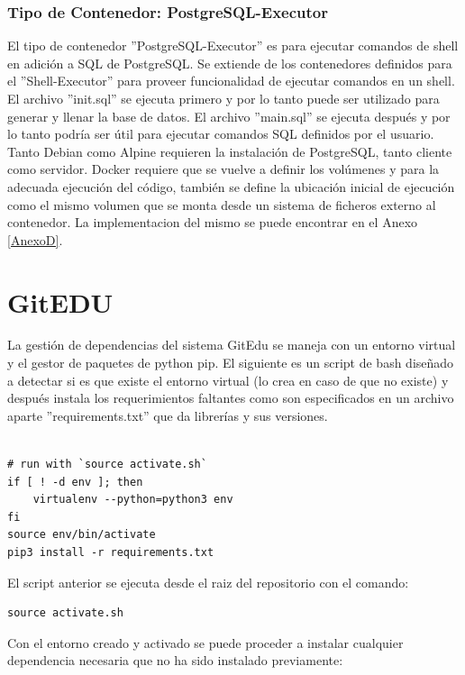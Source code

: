 \subsubsection{Tipo de Contenedor: PostgreSQL-Executor}
El tipo de contenedor ''PostgreSQL-Executor'' es para ejecutar comandos de shell en adición a SQL de PostgreSQL. Se extiende de los contenedores definidos para el ''Shell-Executor'' para proveer funcionalidad de ejecutar comandos en un shell. El archivo ''init.sql'' se ejecuta primero y por lo tanto puede ser utilizado para generar y llenar la base de datos. El archivo ''main.sql'' se ejecuta después y por lo tanto podría ser útil para ejecutar comandos SQL definidos por el usuario. Tanto Debian como Alpine requieren la instalación de PostgreSQL, tanto cliente como servidor. Docker requiere que se vuelve a definir los volúmenes y para la adecuada ejecución del código, también se define la ubicación inicial de ejecución como el mismo volumen que se monta desde un sistema de ficheros externo al contenedor. La implementacion del mismo se puede encontrar en el Anexo \ref{AnexoD}.

\section{GitEDU}

La gestión de dependencias del sistema GitEdu se maneja con un entorno virtual y el gestor de paquetes de python pip. El siguiente es un script de bash diseñado a detectar si es que existe el entorno virtual (lo crea en caso de que no existe) y después instala los requerimientos faltantes como son especificados en un archivo aparte ''requirements.txt'' que da librerías y sus versiones.

\begin{lstlisting}

# run with `source activate.sh` 
if [ ! -d env ]; then
	virtualenv --python=python3 env
fi
source env/bin/activate
pip3 install -r requirements.txt

\end{lstlisting}

El script anterior se ejecuta desde el raiz del repositorio con el comando:

\begin{lstlisting}
source activate.sh
\end{lstlisting}

Con el entorno creado y activado se puede proceder a instalar cualquier dependencia necesaria que no ha sido instalado previamente:

